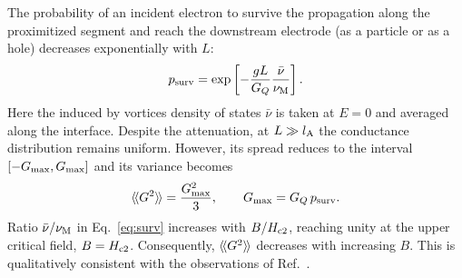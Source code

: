 \documentclass[reprint,
superscriptaddress,
amsmath,
amssymb,
aps,
prl,
floatfix,
english
]{revtex4-2}
\newcommand{\lprox}{L}
\newcommand{\lA}{l_{\rm A}}
\newcommand{\rngl}{\rangle\hspace{-0.05cm}\rangle}
\newcommand{\lngl}{\langle\hspace{-0.05cm}\langle}
\begin{document}
The probability of an incident electron to survive the propagation along the proximitized segment and reach the downstream electrode (as a particle or as a hole) decreases exponentially with $\lprox$:
\begin{equation}\label{eq:surv}
    p_{\rm surv} = \exp \left[-\frac{g\lprox}{G_Q} \frac{\bar{\nu}}{\nu_{\rm M}}\right].
\end{equation}
Here the induced by vortices density of states $\bar{\nu}$ is taken at $E = 0$ and averaged along the interface. 
Despite the attenuation, at $\lprox \gg \lA$ the conductance distribution remains uniform. However, its spread reduces to the interval $[-G_{\rm max}, G_{\rm max}]$ and its variance becomes
\begin{equation}\label{eq:variance}
    \lngl G^2 \rngl = \frac{G_{\rm max}^2}{3},\quad\quad G_{\rm max} = G_Q\, p_{\rm surv}.
\end{equation}
Ratio $\bar{\nu} / \nu_{\rm M}$ in Eq.~\eqref{eq:surv} increases with $B / H_{\rm c 2}$, reaching unity at the upper critical field, $B = H_{\rm c2}$.
Consequently, 
$\lngl G^2 \rngl$ decreases with increasing $B$. This is qualitatively consistent with the observations of Ref.~\cite{zhao2020}.
\end{document}
